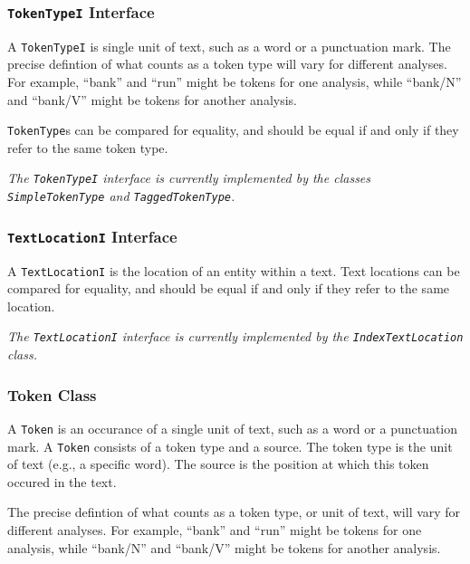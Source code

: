 \documentclass{article}
\begin{document}
\subsubsection{\texttt{TokenTypeI} Interface}

    A \texttt{TokenTypeI} is single unit of text, such as a word or a
    punctuation mark.  The precise defintion of what counts as a token
    type will vary for different analyses.  For example, ``bank'' and
    ``run'' might be tokens for one analysis, while ``bank/N'' and
    ``bank/V'' might be tokens for another analysis.

    \texttt{TokenType}s can be compared for equality, and should be
    equal if and only if they refer to the same token type.

\vspace{2mm}\noindent
\textit{The \texttt{TokenTypeI} interface is currently implemented by
the classes \texttt{SimpleTokenType} and \texttt{TaggedTokenType}.}

\subsubsection{\texttt{TextLocationI} Interface}

    A \texttt{TextLocationI} is the location of an entity within a
    text.  Text locations can be compared for equality, and should be
    equal if and only if they refer to the same location.

\vspace{2mm}\noindent
\textit{The \texttt{TextLocationI} interface is currently implemented
by the \texttt{IndexTextLocation} class.}

\subsubsection{Token Class}

    A \texttt{Token} is an occurance of a single unit of text, such as
    a word or a punctuation mark.  A \texttt{Token} consists of a token type
    and a source.  The token type is the unit of text (e.g., a
    specific word).  The source is the position at which this token
    occured in the text.

    The precise defintion of what counts as a token type, or unit of
    text, will vary for different analyses.  For example, ``bank'' and 
    ``run'' might be tokens for one analysis, while ``bank/N'' and
    ``bank/V'' might be tokens for another analysis.
\end{document}
